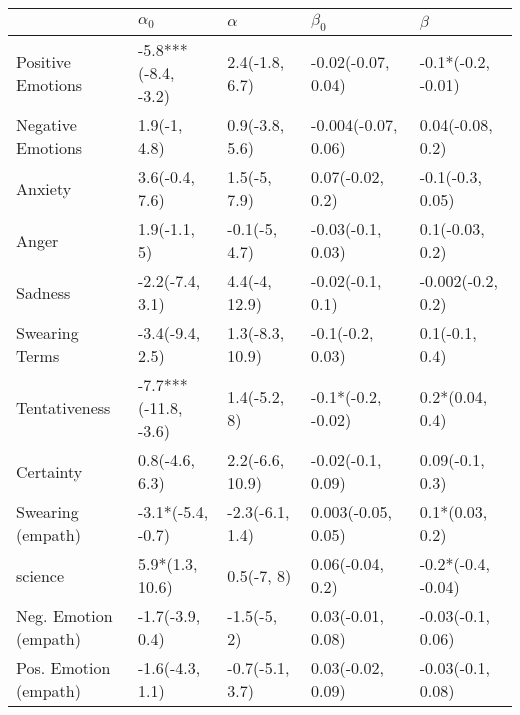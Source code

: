 \begin{tabular}{lllll}
\toprule
{} &            $\alpha_0$ &         $\alpha$ &            $\beta_0$ &             $\beta$ \\
\midrule
Positive Emotions     &   -5.8***(-8.4, -3.2) &   2.4(-1.8, 6.7) &   -0.02(-0.07, 0.04) &  -0.1*(-0.2, -0.01) \\
Negative Emotions     &          1.9(-1, 4.8) &   0.9(-3.8, 5.6) &  -0.004(-0.07, 0.06) &    0.04(-0.08, 0.2) \\
Anxiety               &        3.6(-0.4, 7.6) &     1.5(-5, 7.9) &     0.07(-0.02, 0.2) &    -0.1(-0.3, 0.05) \\
Anger                 &          1.9(-1.1, 5) &    -0.1(-5, 4.7) &    -0.03(-0.1, 0.03) &     0.1(-0.03, 0.2) \\
Sadness               &       -2.2(-7.4, 3.1) &    4.4(-4, 12.9) &     -0.02(-0.1, 0.1) &   -0.002(-0.2, 0.2) \\
Swearing Terms        &       -3.4(-9.4, 2.5) &  1.3(-8.3, 10.9) &     -0.1(-0.2, 0.03) &      0.1(-0.1, 0.4) \\
Tentativeness         &  -7.7***(-11.8, -3.6) &     1.4(-5.2, 8) &   -0.1*(-0.2, -0.02) &     0.2*(0.04, 0.4) \\
Certainty             &        0.8(-4.6, 6.3) &  2.2(-6.6, 10.9) &    -0.02(-0.1, 0.09) &     0.09(-0.1, 0.3) \\
Swearing (empath)     &     -3.1*(-5.4, -0.7) &  -2.3(-6.1, 1.4) &   0.003(-0.05, 0.05) &     0.1*(0.03, 0.2) \\
science               &       5.9*(1.3, 10.6) &       0.5(-7, 8) &     0.06(-0.04, 0.2) &  -0.2*(-0.4, -0.04) \\
Neg. Emotion (empath) &       -1.7(-3.9, 0.4) &      -1.5(-5, 2) &    0.03(-0.01, 0.08) &   -0.03(-0.1, 0.06) \\
Pos. Emotion (empath) &       -1.6(-4.3, 1.1) &  -0.7(-5.1, 3.7) &    0.03(-0.02, 0.09) &   -0.03(-0.1, 0.08) \\
\bottomrule
\end{tabular}
